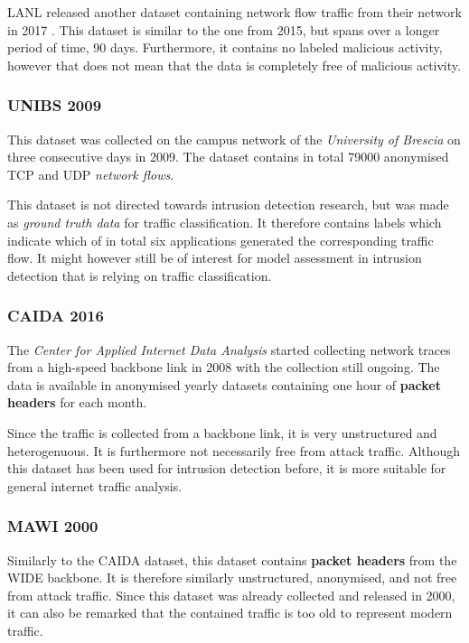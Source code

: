 LANL released another dataset containing network flow traffic from their network in 2017 \cite{turcotte17}. This dataset is similar to the one from 2015, but spans over a longer period of time, 90 days. Furthermore, it contains no labeled malicious activity,  however that does not mean that the data is completely free of malicious activity.

\subsubsection*{UNIBS 2009\cite{UNIBS2009data}}

This dataset was collected on the campus network of the \textit{University of Brescia} on three consecutive days in 2009. The dataset contains in total 79000 anonymised TCP and UDP \textit{network flows}. 

This dataset is not directed towards intrusion detection research, but was made as \textit{ground truth data} for traffic classification. It therefore contains labels which indicate which of in total six applications generated the corresponding traffic flow. It might however still be of interest for model assessment in intrusion detection that is relying on traffic classification.

\subsubsection*{CAIDA 2016 \cite{walsworth2015caida}}

The \textit{Center for Applied Internet Data Analysis} started collecting network traces from a high-speed backbone link in 2008 with the collection still ongoing. The data is available in anonymised yearly datasets containing one hour of \textbf{packet headers} for each month. 

Since the traffic is collected from a backbone link, it is very unstructured and heterogenuous. It is furthermore not necessarily free from attack traffic. Although this dataset has been used for intrusion detection before, it is more suitable for general internet traffic analysis.


\subsubsection*{MAWI 2000 \cite{sony2000traffic}}

Similarly to the CAIDA dataset, this dataset contains \textbf{packet headers} from the WIDE backbone. It is therefore similarly unstructured, anonymised, and not free from attack traffic. Since this dataset was already collected and released in 2000, it can also be remarked that the contained traffic is too old to represent modern traffic. 


